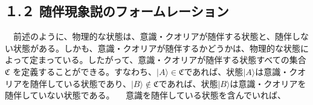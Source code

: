 \subsection{１.２ 随伴現象説のフォームレーション}
　前述のように、物理的な状態は、意識・クオリアが随伴する状態と、随伴しない状態がある。しかも、意識・クオリアが随伴するかどうかは、物理的な状態によって定まっている。したがって、意識・クオリアが随伴する状態すべての集合 $\mathfrak{C}$ を定義することができる。すなわち、$|A\rangle\in\mathfrak{C}$であれば、状態$|A\rangle$は意識・クオリアを随伴している状態であり、$|B\rangle\notin\mathfrak{C}$であれば、状態$|B\rangle$は意識・クオリアを随伴していない状態である。
　意識を随伴している状態を含んでいれば、